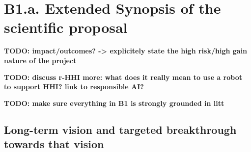 \documentclass[11pt,a4paper]{report}
\newcommand{\TODO}[1]{{\color{red}\textbf{TODO: #1}}}
\newcommand{\eu}[1]{}
\begin{document}
\newcommand{\wpThree}{Trustworthy-by-design socio-cognitive architecture for robot-supported human-human interactions}
\newcommand{\wpThreeShort}{Socio-cognitive architecture}

\newcommand{\wpFour}{Data-driven social behaviour generation}
\newcommand{\wpFourShort}{Social behaviours}

\newcommand{\wpFive}{Evidence-based research: demonstrable usefulness of social robots in
real-world, complex scenarios}
\newcommand{\wpFiveShort}{Experimental investigation}







\newrefsection

\chapter{B1.a. Extended Synopsis of the scientific proposal}\label{part1}
\eu{(max 5 pages)}

\eu{The Extended Synopsis should give a concise presentation of the scientific
proposal, with particular attention to the ground-breaking nature of the
research project and the feasibility of the outlined scientific approach.
Describe the proposed work in the context of the state of the art of the field.
References to literature should also be included. References do not count
towards the page limits. It is important that this extended synopsis contains
all essential information including the feasibility of the scientific proposal
since the panel will only evaluate Part B1 at step 1.}

\TODO{impact/outcomes? -> explicitely state the high risk/high gain nature of
the project}

\TODO{discuss r-HHI more: what does it really mean to use a robot to support
HHI? link to responsible AI?}

\TODO{make sure everything in B1 is strongly grounded in litt}

\section{Long-term vision and targeted breakthrough towards that vision}
\end{document}
